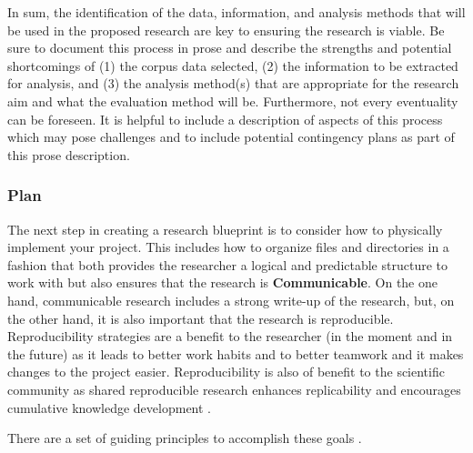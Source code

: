 \documentclass[
]{article}
\begin{document}
In sum, the identification of the data, information, and analysis methods that will be used in the proposed research are key to ensuring the research is viable. Be sure to document this process in prose and describe the strengths and potential shortcomings of (1) the corpus data selected, (2) the information to be extracted for analysis, and (3) the analysis method(s) that are appropriate for the research aim and what the evaluation method will be. Furthermore, not every eventuality can be foreseen. It is helpful to include a description of aspects of this process which may pose challenges and to include potential contingency plans as part of this prose description.

\hypertarget{plan}{%
\subsubsection{Plan}\label{plan}}

The next step in creating a research blueprint is to consider how to physically implement your project. This includes how to organize files and directories in a fashion that both provides the researcher a logical and predictable structure to work with but also ensures that the research is \textbf{Communicable}. On the one hand, communicable research includes a strong write-up of the research, but, on the other hand, it is also important that the research is reproducible. Reproducibility strategies are a benefit to the researcher (in the moment and in the future) as it leads to better work habits and to better teamwork and it makes changes to the project easier. Reproducibility is also of benefit to the scientific community as shared reproducible research enhances replicability and encourages cumulative knowledge development \citep{Gandrud2015}.

There are a set of guiding principles to accomplish these goals \citep{Gentleman2007, Marwick2018}.
\end{document}
